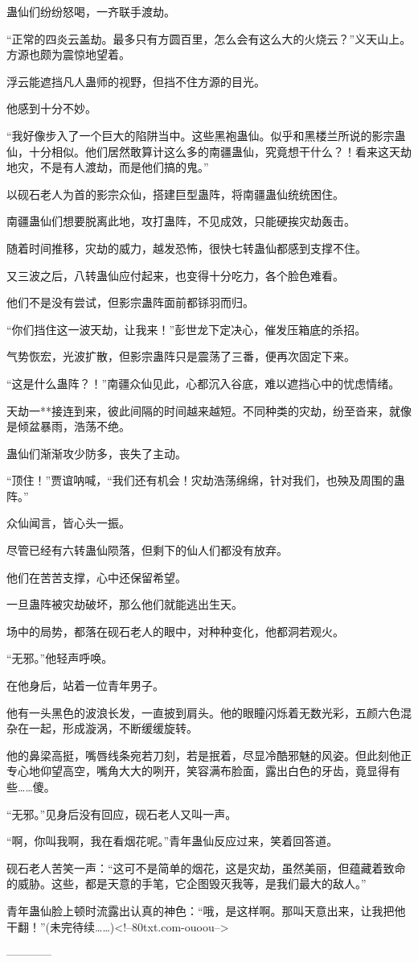 \begin{this_body}
蛊仙们纷纷怒喝，一齐联手渡劫。

“正常的四炎云盖劫。最多只有方圆百里，怎么会有这么大的火烧云？”义天山上。方源也颇为震惊地望着。

浮云能遮挡凡人蛊师的视野，但挡不住方源的目光。

他感到十分不妙。

“我好像步入了一个巨大的陷阱当中。这些黑袍蛊仙。似乎和黑楼兰所说的影宗蛊仙，十分相似。他们居然敢算计这么多的南疆蛊仙，究竟想干什么？！看来这天劫地灾，不是有人渡劫，而是他们搞的鬼。”

以砚石老人为首的影宗众仙，搭建巨型蛊阵，将南疆蛊仙统统困住。

南疆蛊仙们想要脱离此地，攻打蛊阵，不见成效，只能硬挨灾劫轰击。

随着时间推移，灾劫的威力，越发恐怖，很快七转蛊仙都感到支撑不住。

又三波之后，八转蛊仙应付起来，也变得十分吃力，各个脸色难看。

他们不是没有尝试，但影宗蛊阵面前都铩羽而归。

“你们挡住这一波天劫，让我来！”彭世龙下定决心，催发压箱底的杀招。

气势恢宏，光波扩散，但影宗蛊阵只是震荡了三番，便再次固定下来。

“这是什么蛊阵？！”南疆众仙见此，心都沉入谷底，难以遮挡心中的忧虑情绪。

天劫一**接连到来，彼此间隔的时间越来越短。不同种类的灾劫，纷至沓来，就像是倾盆暴雨，浩荡不绝。

蛊仙们渐渐攻少防多，丧失了主动。

“顶住！”贾谊呐喊，“我们还有机会！灾劫浩荡绵绵，针对我们，也殃及周围的蛊阵。”

众仙闻言，皆心头一振。

尽管已经有六转蛊仙陨落，但剩下的仙人们都没有放弃。

他们在苦苦支撑，心中还保留希望。

一旦蛊阵被灾劫破坏，那么他们就能逃出生天。

场中的局势，都落在砚石老人的眼中，对种种变化，他都洞若观火。

“无邪。”他轻声呼唤。

在他身后，站着一位青年男子。

他有一头黑色的波浪长发，一直披到肩头。他的眼瞳闪烁着无数光彩，五颜六色混杂在一起，形成漩涡，不断缓缓旋转。

他的鼻梁高挺，嘴唇线条宛若刀刻，若是抿着，尽显冷酷邪魅的风姿。但此刻他正专心地仰望高空，嘴角大大的咧开，笑容满布脸面，露出白色的牙齿，竟显得有些……傻。

“无邪。”见身后没有回应，砚石老人又叫一声。

“啊，你叫我啊，我在看烟花呢。”青年蛊仙反应过来，笑着回答道。

砚石老人苦笑一声：“这可不是简单的烟花，这是灾劫，虽然美丽，但蕴藏着致命的威胁。这些，都是天意的手笔，它企图毁灭我等，是我们最大的敌人。”

青年蛊仙脸上顿时流露出认真的神色：“哦，是这样啊。那叫天意出来，让我把他干翻！”(未完待续……)<!--80txt.com-ouoou-->

------------

\end{this_body}

